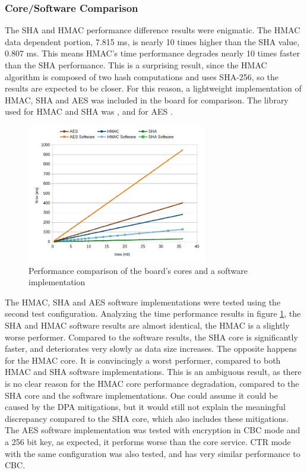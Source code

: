 \subsubsection{Core/Software Comparison}\label{chap:evaluation:services:software}

The SHA and HMAC performance difference results were enigmatic. The HMAC data dependent portion, 7.815 ms, is nearly 10 times higher than the SHA value, 0.807 ms. This means HMAC's time performance degrades nearly 10 times faster than the SHA performance. This is a surprising result, since the HMAC algorithm is composed of two hash computations and uses SHA-256, so the results are expected to be closer.
For this reason, a lightweight implementation of HMAC, SHA and AES was included in the board for comparison. The library used for HMAC and SHA was \cite{ogayHMAC}, and for AES \cite{tinycrypt}. 

\begin{figure}[h!]
	\centering
	\includegraphics[width=0.7\textwidth]{./Images/software-core-time.png}
	\caption{Performance comparison of the board's cores and a software implementation}
	\label{fig:performance:software-core-time}
\end{figure}

The HMAC, SHA and AES software implementations were tested using the second test configuration.
Analyzing the time performance results in figure \ref{fig:performance:software-core-time}, the SHA and HMAC software results are almost identical, the HMAC is a slightly worse performer. Compared to the software results, the SHA core is significantly faster, and deteriorates very slowly as data size increases. The opposite happens for the HMAC core. It is convincingly a worst performer, compared to both HMAC and SHA software implementations. 
This is an ambiguous result, as there is no clear reason for the HMAC core performance degradation, compared to the SHA core and the software implementations. One could assume it could be caused by the DPA mitigations, but it would still not explain the meaningful discrepancy compared to the SHA core, which also includes these mitigations.
The AES software implementation was tested with encryption in CBC mode and a 256 bit key, as expected, it performs worse than the core service. CTR mode with the same configuration was also tested, and has very similar performance to CBC.

